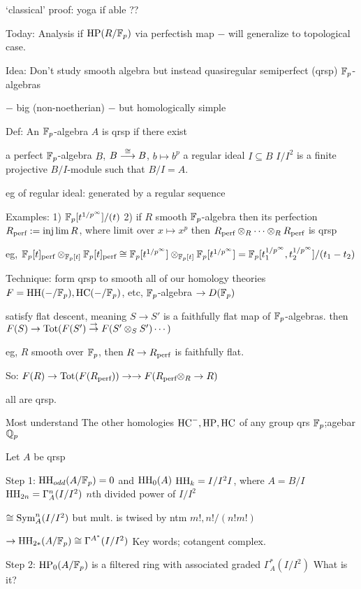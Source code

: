 `classical' proof: yoga if able ??

Today: Analysis if $\operatorname{HP}(R/\mathbb{F}_p)$ via perfectish map $-$ will generalize to topological case. 

Idea: Don't study smooth algebra but instead quasiregular semiperfect (qrsp) $\mathbb{F}_p$-algebras

$-$ big (non-noetherian)
$-$ but homologically simple

Def: An $\mathbb{F}_p$-algebra $A$ is qrsp if there exist

a perfect $\mathbb{F}_p$-algebra $B$, $B \stackrel{\cong}{\longrightarrow} B$, $b \mapsto b^p$
a regular ideal $I \subseteq B$
$I/I^2$ is a finite projective $B/I$-module such that $B/I= A$. 


eg of regular ideal: generated by a regular sequence

Examples:
1) $\mathbb{F}_p[t^{1/p^\infty}]/(t)$
2) if $R$ smooth $\mathbb{F}_p$-algebra then its perfection $R_{\text{perf}}:= \injlim R$, where limit over $x \mapsto x^p$ then $R_{\text{perf}} \otimes_R \cdots \otimes_R R_{\text{perf}}$ is qrsp

eg, $\mathbb{F}_p[t]_{\text{perf}} \otimes_{\mathbb{F}_p[t]} \mathbb{F}_p[t]_{\text{perf}} \cong \mathbb{F}_p[t^{1/p^\infty}] \otimes_{\mathbb{F}_p[t]} \mathbb{F}_p[t^{1/p^\infty}]= \mathbb{F}_p[t_1^{1/p^\infty}, t_2^{1/p^\infty}]/(t_1-t_2)$


Technique: form qrsp to smooth all of our homology theories $F= \operatorname{HH}(-/\mathbb{F}_p), \operatorname{HC}(-/\mathbb{F}_p)$, etc, 
$\mathbb{F}_p$-algebra $\to D(\mathbb{F}_p)$

satisfy flat descent, meaning $S \to S'$ is a faithfully flat map of $\mathbb{F}_p$-algebras. then $F(S) \to \operatorname{Tot}( F(S') \stackrel{\to}{\to} F(S' \otimes_S S') \cdots)$

eg, $R$ smooth over $\mathbb{F}_p$, then $R \to R_{\text{perf}}$ is faithfully flat. 

So: $F(R) \to \operatorname{Tot}(F(R_{\text{perf}})) \to\to F(R_{\text{perf}} \otimes_R \to R)$

all are qrsp.


Most understand The other homologies $\operatorname{HC}^-,\operatorname{HP},\operatorname{HC}$ of any group qrs $\mathbb{F}_p$;agebar$\mathbb{Q}_p$


Let $A$ be qrsp

Step 1: $\operatorname{HH}_{odd}(A/\mathbb{F}_p)=0$ and $\operatorname{HH}_0(A)$
$\operatorname{HH}_k = I/I^2 I$, where $A= B/I$
$\operatorname{HH}_{2n}= \Gamma_A^n(I/I^2)$
$n$th divided power of $I/I^2$

$\cong \operatorname{Sym}_A^n(I/I^2)$ but mult. is twised by ntm $m!, n!/(n!m!)$

$\to \operatorname{HH}_{2*}(A/\mathbb{F}_p) \cong \Gamma^{A^*}(I/I^2)$
Key words; cotangent complex. 

Step 2: $\operatorname{HP}_0(A/\mathbb{F}_p)$ is a filtered ring with associated graded $\Gamma_A^*(I/I^2)$
What is it?

